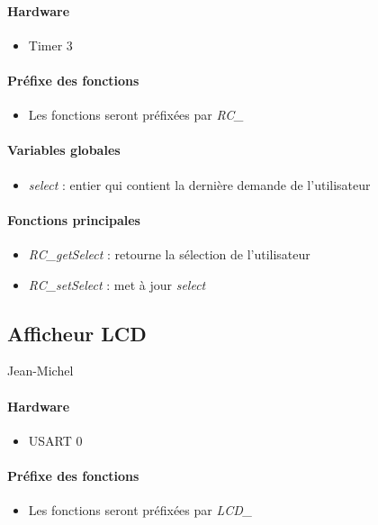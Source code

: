 \documentclass[a4paper]{report}
\begin{document}
\paragraph{Hardware}
\begin{itemize}
\item Timer 3
\end{itemize}
\paragraph{Préfixe des fonctions}
\begin{itemize}
\item Les fonctions seront préfixées par \emph{RC\_}
\end{itemize}
\paragraph{Variables globales}
\begin{itemize}
\item \emph{select} : entier qui contient la dernière demande de l'utilisateur
\end{itemize}
\paragraph{Fonctions principales}
\begin{itemize}
\item \emph{RC\_getSelect} : retourne la sélection de l’utilisateur
\item \emph{RC\_setSelect} : met à jour \emph{select}
\end{itemize}

\subsection{Afficheur LCD}
Jean-Michel 
\paragraph{Hardware}
\begin{itemize}
\item USART 0
\end{itemize}
\paragraph{Préfixe des fonctions}
\begin{itemize}
\item Les fonctions seront préfixées par \emph{LCD\_}
\end{itemize}
\end{document}
